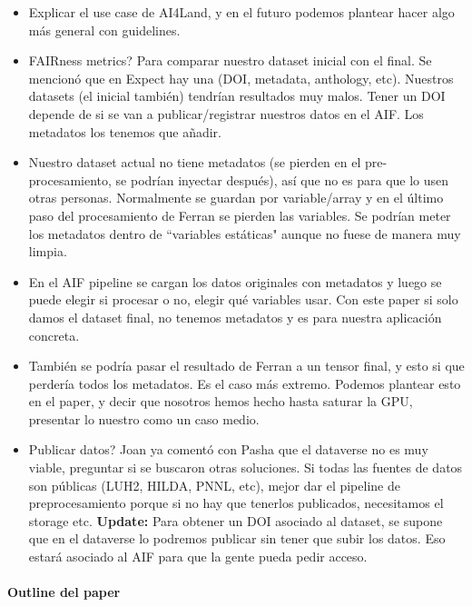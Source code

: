 \documentclass{article}
\begin{document}
\begin{itemize}
    \item Explicar el use case de AI4Land, y en el futuro podemos plantear hacer algo más general con guidelines.

    \item FAIRness metrics? Para comparar nuestro dataset inicial con el final. Se mencionó que en Expect hay una (DOI, metadata, anthology, etc). Nuestros datasets (el inicial también) tendrían resultados muy malos. Tener un DOI depende de si se van a publicar/registrar nuestros datos en el AIF. Los metadatos los tenemos que añadir.

    \item Nuestro dataset actual no tiene metadatos (se pierden en el pre-procesamiento, se podrían inyectar después), así que no es para que lo usen otras personas. Normalmente se guardan por variable/array y en el último paso del procesamiento de Ferran se pierden las variables. Se podrían meter los metadatos dentro de ``variables estáticas" aunque no fuese de manera muy limpia.

    \item En el AIF pipeline se cargan los datos originales con metadatos y luego se puede elegir si procesar o no, elegir qué variables usar. Con este paper si solo damos el dataset final, no tenemos metadatos y es para nuestra aplicación concreta.

    \item También se podría pasar el resultado de Ferran a un tensor final, y esto si que perdería todos los metadatos. Es el caso más extremo. Podemos plantear esto en el paper, y decir que nosotros hemos hecho hasta saturar la GPU, presentar lo nuestro como un caso medio.

    \item Publicar datos? Joan ya comentó con Pasha que el dataverse no es muy viable, preguntar si se buscaron otras soluciones. Si todas las fuentes de datos son públicas (LUH2, HILDA, PNNL, etc), mejor dar el pipeline de preprocesamiento porque si no hay que tenerlos publicados, necesitamos el storage etc. \textbf{Update:} Para obtener un DOI asociado al dataset, se supone que en el dataverse lo podremos publicar sin tener que subir los datos. Eso estará asociado al AIF para que la gente pueda pedir acceso.
\end{itemize}

\paragraph{Outline del paper}
\end{document}
